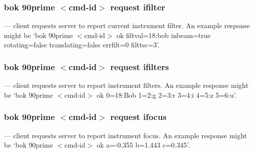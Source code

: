\documentclass[12pt,twoside]{article}
\begin{document}
\subsubsection{bok 90prime $<$cmd-id$>$ request ifilter}
  --- client requests server to report current instrument filter. An example response might be `{\sc bok 90prime $<$cmd-id$>$ ok filtval=18:bob inbeam=true rotating=false translating=false errfilt=0 filttsc=3}'.

\subsubsection{bok 90prime $<$cmd-id$>$ request ifilters}
  --- client requests server to report instrument filters. An example response might be `{\sc bok 90prime $<$cmd-id$>$ ok 0=18:Bob 1=2:g 2=3:r 3=4:i 4=5:z 5=6:u}'.

\subsubsection{bok 90prime $<$cmd-id$>$ request ifocus}
  --- client requests server to report instrument focus. An example response might be `{\sc bok 90prime $<$cmd-id$>$ ok a=-0.355 b=1.443 c=0.345}'.
\end{document}

